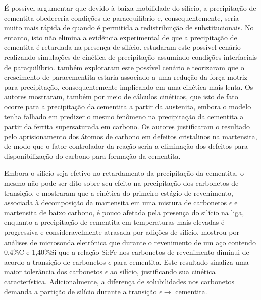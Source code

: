 É possível argumentar que devido à baixa mobilidade do silício, a precipitação de cementita obedeceria condições de paraequilíbrio e, consequentemente, seria muito mais rápida de quando é permitida a redistribuição de substitucionais. No entanto, isto não elimina a evidência experimental de que a precipitação de cementita é retardada na presença de silício.  estudaram este possível cenário realizando simulações de cinética de precipitação assumindo condições interfaciais de paraquilíbrio.  também exploraram este possível cenário e teorizaram que o crescimento de paracementita estaria associado a uma redução da força motriz para precipitação, consequentemente implicando em uma cinética mais lenta. Os autores mostraram, também por meio de cálculos cinéticos, que isto de fato ocorre para a precipitação da cementita a partir da austenita, embora o modelo tenha falhado em predizer o mesmo fenômeno na precipitação da cementita a partir da ferrita supersaturada em carbono. Os autores justificaram o resultado pelo aprisionamento dos átomos de carbono em defeitos cristalinos na martensita, de modo que o fator controlador da reação seria a eliminação dos defeitos para disponibilização do carbono para formação da cementita.


Embora o silício seja efetivo no retardamento da precipitação da cementita, o mesmo não pode ser dito sobre seu efeito na precipitação dos carbonetos de transição.  e  mostraram que a cinética do primeiro estágio de revenimento, associada à decomposição da martensita em uma mistura de carbonetos $\epsilon$ e martensita de baixo carbono, é pouco afetada pela presença do silício na liga, enquanto a precipitação de cementita em temperaturas mais elevadas é progressiva e consideravelmente atrasada por adições de silício.  mostrou por análises de microsonda eletrônica que durante o revenimento de um aço contendo 0,4\%C e 1,40\%Si que a relação Si:Fe nos carbonetos de revenimento diminui de acordo a transição de carbonetos $\epsilon$ para cementita. Este resultado sinaliza uma maior tolerância dos carbonetos $\epsilon$ ao silício, justificando sua cinética característica. Adicionalmente, a diferença de solubilidades nos carbonetos demanda a partição de silício durante a transição $\epsilon \rightarrow$ cementita.

